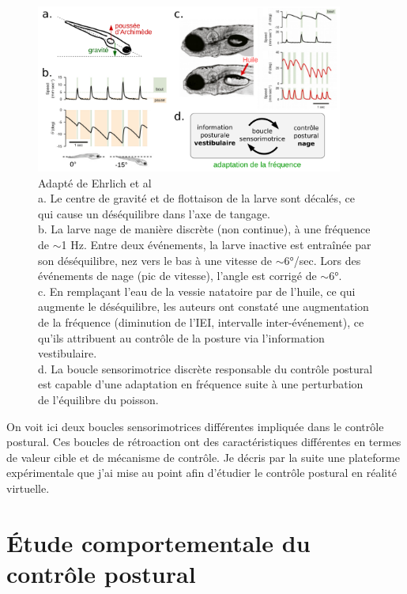 \begin{figure}
\centering
\includegraphics[width=0.9\textwidth]{./files/schoppik_movement-initiation.svg.png}
\caption{Adapté de Ehrlich et al \cite{ehrlich_control_2017}
\\
a. Le centre de gravité et de flottaison de la larve sont décalés, ce qui cause un déséquilibre dans l'axe de tangage.
\\
b. La larve nage de manière discrète (non continue), à une fréquence de $\sim$1 Hz. Entre deux événements, la larve inactive est entraînée par son déséquilibre, nez vers le bas à une vitesse de $\sim$6°/sec. Lors des événements de nage (pic de vitesse), l'angle est corrigé de $\sim$6°.
\\
c. En remplaçant l'eau de la vessie natatoire par de l'huile, ce qui augmente le déséquilibre, les auteurs ont constaté une augmentation de la fréquence (diminution de l'IEI, intervalle inter-événement), ce qu'ils attribuent au contrôle de la posture via l'information vestibulaire.
\\
d. La boucle sensorimotrice discrète responsable du contrôle postural est capable d'une adaptation en fréquence suite à une perturbation de l'équilibre du poisson.}
\end{figure}

On voit ici deux boucles sensorimotrices différentes impliquée dans le contrôle postural. Ces boucles de rétroaction ont des caractéristiques différentes en termes de valeur cible et de mécanisme de contrôle. Je décris par la suite une plateforme expérimentale que j'ai mise au point afin d'étudier le contrôle postural en réalité virtuelle.

\section{Étude comportementale du contrôle postural}

